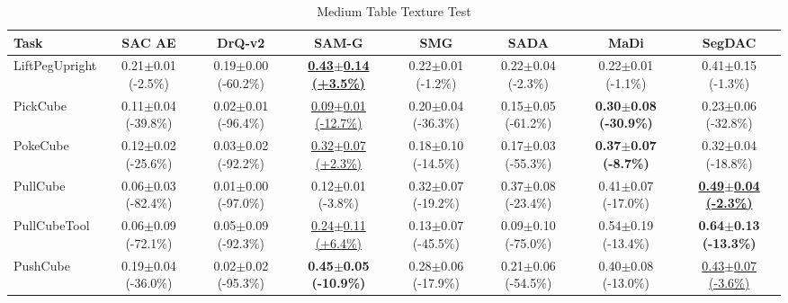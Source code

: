 \begin{table}[htbp]
\centering
\scriptsize
\caption{Medium Table Texture Test}
\label{tab:appendix_tabletexturetest_medium}
\begin{adjustbox}{max width=\textwidth}
\begin{tabular}{l*{7}{c}}
\toprule
\textbf{Task} & \textbf{SAC AE} & \textbf{DrQ-v2} & \textbf{SAM-G} & \textbf{SMG} & \textbf{SADA} & \textbf{MaDi} & \textbf{SegDAC} \\
\midrule
LiftPegUpright & 0.21$\pm$0.01 \scriptsize{(-2.5\%)} & 0.19$\pm$0.00 \scriptsize{(-60.2\%)} & \textbf{\underline{0.43$\pm$0.14 \scriptsize{(+3.5\%)}}} & 0.22$\pm$0.01 \scriptsize{(-1.2\%)} & 0.22$\pm$0.04 \scriptsize{(-2.3\%)} & 0.22$\pm$0.01 \scriptsize{(-1.1\%)} & 0.41$\pm$0.15 \scriptsize{(-1.3\%)} \\
PickCube & 0.11$\pm$0.04 \scriptsize{(-39.8\%)} & 0.02$\pm$0.01 \scriptsize{(-96.4\%)} & \underline{0.09$\pm$0.01 \scriptsize{(-12.7\%)}} & 0.20$\pm$0.04 \scriptsize{(-36.3\%)} & 0.15$\pm$0.05 \scriptsize{(-61.2\%)} & \textbf{0.30$\pm$0.08 \scriptsize{(-30.9\%)}} & 0.23$\pm$0.06 \scriptsize{(-32.8\%)} \\
PokeCube & 0.12$\pm$0.02 \scriptsize{(-25.6\%)} & 0.03$\pm$0.02 \scriptsize{(-92.2\%)} & \underline{0.32$\pm$0.07 \scriptsize{(+2.3\%)}} & 0.18$\pm$0.10 \scriptsize{(-14.5\%)} & 0.17$\pm$0.03 \scriptsize{(-55.3\%)} & \textbf{0.37$\pm$0.07 \scriptsize{(-8.7\%)}} & 0.32$\pm$0.04 \scriptsize{(-18.8\%)} \\
PullCube & 0.06$\pm$0.03 \scriptsize{(-82.4\%)} & 0.01$\pm$0.00 \scriptsize{(-97.0\%)} & 0.12$\pm$0.01 \scriptsize{(-3.8\%)} & 0.32$\pm$0.07 \scriptsize{(-19.2\%)} & 0.37$\pm$0.08 \scriptsize{(-23.4\%)} & 0.41$\pm$0.07 \scriptsize{(-17.0\%)} & \textbf{\underline{0.49$\pm$0.04 \scriptsize{(-2.3\%)}}} \\
PullCubeTool & 0.06$\pm$0.09 \scriptsize{(-72.1\%)} & 0.05$\pm$0.09 \scriptsize{(-92.3\%)} & \underline{0.24$\pm$0.11 \scriptsize{(+6.4\%)}} & 0.13$\pm$0.07 \scriptsize{(-45.5\%)} & 0.09$\pm$0.10 \scriptsize{(-75.0\%)} & 0.54$\pm$0.19 \scriptsize{(-13.4\%)} & \textbf{0.64$\pm$0.13 \scriptsize{(-13.3\%)}} \\
PushCube & 0.19$\pm$0.04 \scriptsize{(-36.0\%)} & 0.02$\pm$0.02 \scriptsize{(-95.3\%)} & \textbf{0.45$\pm$0.05 \scriptsize{(-10.9\%)}} & 0.28$\pm$0.06 \scriptsize{(-17.9\%)} & 0.21$\pm$0.06 \scriptsize{(-54.5\%)} & 0.40$\pm$0.08 \scriptsize{(-13.0\%)} & \underline{0.43$\pm$0.07 \scriptsize{(-3.6\%)}} \\

\end{tabular}
\end{adjustbox}
\end{table}
